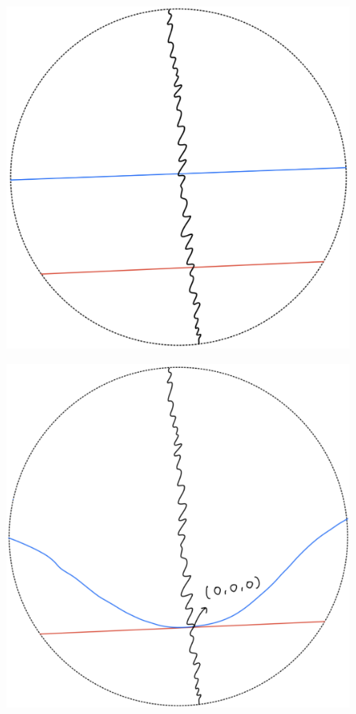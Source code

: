 \begin{definition}
\begin{enumerate}
\begin{itemize}
\begin{figure}[H]
    \centering
    \includegraphics[scale = 0.95]{diagrams/lemma1/16.png} 
    \caption{}
    \label{fig:your-label}
\end{figure}
\begin{figure}[H]
    \centering
    \includegraphics[scale = 0.95]{diagrams/lemma1/17.png} 

\end{figure}
\end{itemize}
\end{enumerate}
\end{definition}
